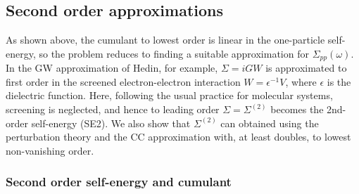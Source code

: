 \documentclass[aps,prb,twocolumn,groupaddress,floatfix]{revtex4}
\begin{document}
\subsection{Second order approximations}
\label{sec:2ose_cum}

As shown above, the cumulant to lowest order 
is linear in the one-particle self-energy, so the problem reduces to finding
a suitable approximation for $\Sigma_{pp}(\omega)$.
In the GW approximation of Hedin,\cite{Hedin99review} for example,
$\Sigma = iGW$ is approximated to first order in the screened
electron-electron interaction $W=\epsilon^{-1}V$, where $\epsilon$ is the 
dielectric function. Here, following the usual practice
for molecular systems, screening is neglected, and hence to leading order
$\Sigma=\Sigma^{(2)}$ becomes the 2nd-order
self-energy (SE2).\cite{linderberg2004propagators,szabo1996modern}
We also show that $\Sigma^{(2)}$
can obtained using the perturbation theory and the
CC approximation with, at least doubles, to lowest non-vanishing order.

\subsubsection{Second order self-energy and cumulant}
\end{document}
